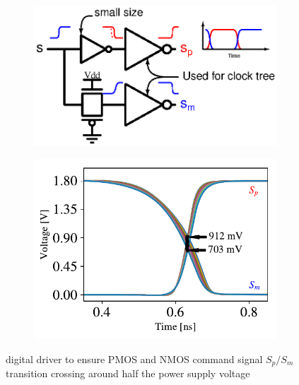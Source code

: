 \begin{figure}[htp]
	\centering
	\begin{subfigure}[b]{0.48\textwidth}
		\centering
		\includegraphics[width=\textwidth]{Chapter4/Figs/digital-driver.ps}
		\label{fig:dig-driver-ideal}
	\end{subfigure}
	\begin{subfigure}[b]{0.48\textwidth}
		\centering
		\includegraphics[width=\textwidth]{Chapter4/Figs/crossing-driver-with-tgate.pdf}
		\label{fig:dig-driver-crossing}
	\end{subfigure}
	\caption{digital driver to ensure PMOS and NMOS command signal $S_p/S_m$ transition crossing around half the power supply voltage}
	\label{fig:dig-driver}
\end{figure}

